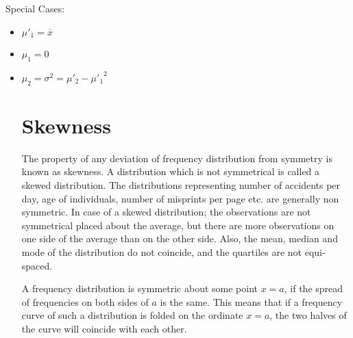 \documentclass[
10pt, %
a4paper, %
]{report}
\begin{document}
Special Cases:
\begin{itemize}
\item \(\mu'_1 = \overline{x}\)
\item \(\mu_1 = 0\)
\item \(\mu_2 = \sigma^2 = \mu'_2 - {\mu'_1}^2\)

\section*{Skewness}

The property of any deviation of frequency distribution from symmetry is known as skewness. A distribution which is not symmetrical is called a skewed distribution. The distributions representing number of accidents per day, age of individuals, number of misprints per page etc. are generally non symmetric. In case of a skewed distribution; the observations are not symmetrical placed about the average, but there are more observations on one side of the average than on the other side. Also, the mean, median and mode of the distribution do not coincide, and the quartiles are not equi-spaced.

A frequency distribution is symmetric about some point \(x=a\), if the spread of frequencies on both sides of \(a\) is the same. This means that if a frequency curve of such a distribution is folded on the ordinate \(x = a\), the two halves of the curve will coincide with each other.


\end{itemize}
\end{document}
